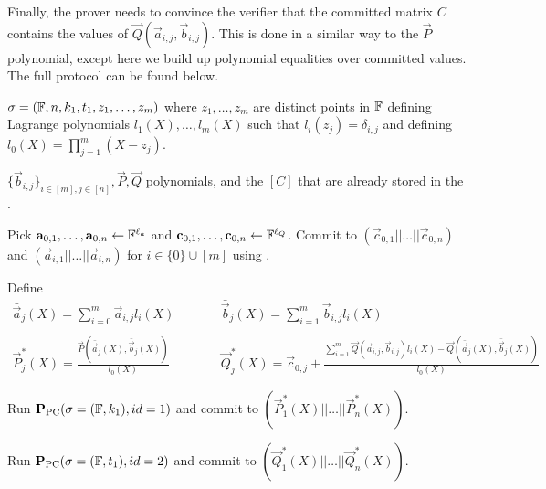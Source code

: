 Finally, the prover needs to convince the verifier that the committed matrix $C$ contains the values of $\vec{Q}(\vec{a}_{i,j},\vec{b}_{i,j})$. This is done in a similar way to the $\vec{P}$ polynomial, except here we build up polynomial equalities over committed values. The full protocol can be found below.

\begin{description} \label{protmultiversion}
\item[Common Reference String:] $\mathsf{\sigma}=(\mathbb{F},n,k_1,t_1,z_1,\ldots,z_m)$ where $z_1,\ldots,z_m$ are distinct points in $\mathbb{F}$ defining Lagrange polynomials $l_1(X),\ldots,l_m(X)$ such that $l_i(z_j)=\delta_{i,j}$ and defining $l_0(X)=\prod_{j=1}^m(X-z_j)$.
%
\item[Instance:] $\lbrace \vec{b}_{i,j} \rbrace_{i \in [m], j \in [n]}, \vec{P},\vec{Q}$ polynomials, and the $[C]$ that are already stored in the \ILC.
%
\item[P:]
Pick $\mathbf{a}_{0,1},\ldots,\mathbf{a}_{0,n}\gets \mathbb{F}^{\ell_a}$ and $\mathbf{c}_{0,1},\ldots,\mathbf{c}_{0,n}\gets \mathbb{F}^{\ell_Q}$. Commit to $(\vec{c}_{0,1}||\ldots||\vec{c}_{0,n})$ and $\left( \vec{a}_{i,1}||\ldots||\vec{a}_{i,n}\right)$ for $i\in \{0\}\cup [m]$ using \ILCcommit.

Define
$$\begin{array}{lll}
\bar{\vec{a}}_{j}(X) = \sum_{i=0}^m \vec{a}_{i,j} l_i(X) & \qquad &
\bar{\vec{b}}_{j}(X) = \sum_{i=1}^m \vec{b}_{i,j} l_i(X) \\ \\
\vec{P}_j^*(X)=\frac{\vec{P}\left(\bar{\vec{a}}_j(X),\bar{\vec{b}}_j(X)\right)}{l_0(X)} & & \vec{Q}_j^*(X)=\vec{c}_{0,j}+\frac{\sum_{i=1}^m\vec{Q}(\vec{a}_{i,j},\vec{b}_{i,j})l_i(X)-\vec{Q}\left(\bar{\vec{a}}_j(X),\bar{\vec{b}}_j(X)\right)}{l_0(X)}
\end{array}$$

Run $\textbf{P}_\mathrm{PC}(\mathsf{\sigma}=(\mathbb{F},k_1),id=1)$ and commit to $\left( \vec{P}_1^*(X)||\ldots||\vec{P}_n^*(X)\right)$.

Run $\textbf{P}_\mathrm{PC}(\mathsf{\sigma}=(\mathbb{F},t_1),id=2)$ and commit to $\left( \vec{Q}_1^*(X)||\ldots||\vec{Q}_n^*(X)\right)$.


\end{description}
